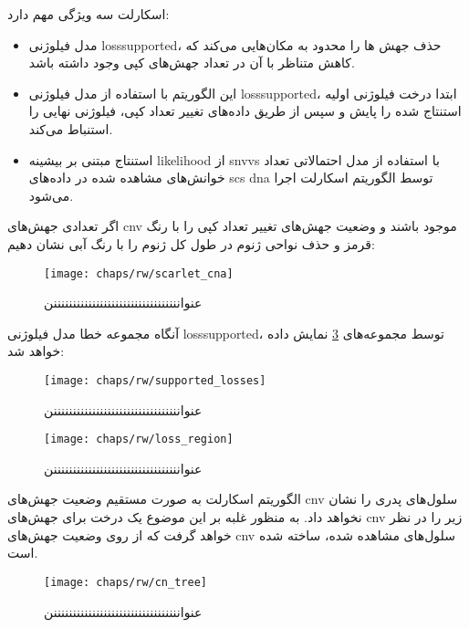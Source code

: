 اسکارلت سه ویژگی مهم دارد: 

\begin{itemize}
	\item     مدل فیلوژنی \gls{losssupported}، حذف جهش ها را محدود به مکان‌هایی می‌کند که کاهش متناظر با آن در تعداد جهش‌های کپی وجود داشته باشد. 
	
	\item 	این الگوریتم با استفاده از مدل فیلوژنی \gls{losssupported}، ابتدا درخت فیلوژنی اولیه استنتاج شده را پایش  و سپس از طریق داده‌های تغییر تعداد کپی، فیلوژنی نهایی را استنباط می‌کند. 
	\item	استنتاج مبتنی بر بیشینه  \gls{likelihood}  از \glspl{snvv} با استفاده از مدل احتمالاتی تعداد خوانش‌های مشاهده شده در داده‌های   \gls{scs} \gls{dna} توسط الگوریتم اسکارلت اجرا می‌شود.  
\end{itemize}




اگر تعدادی جهش‌های \gls{cnv} موجود باشند و  وضعیت جهش‌های تغییر تعداد کپی را با رنگ قرمز و حذف نواحی ژنوم در طول کل ژنوم را با رنگ آبی نشان دهیم:


\begin{figure}[!ht]
	\centerline{\texttt{[image: chaps/rw/scarlet\_cna]}}
	\caption{عنوانننننننننننننننننننننننننننننننننن}
	\label{fig:ch_rw:scarlet_cna}
\end{figure}

آنگاه مجموعه خطا مدل فیلوژنی \gls{losssupported}، توسط مجموعه‌های \ref{fig:ch_rw:loss_region} نمایش داده خواهد شد: 

\begin{figure}[!ht]
	\centerline{\texttt{[image: chaps/rw/supported\_losses]}}
	\caption{عنوانننننننننننننننننننننننننننننننننن}
	\label{fig:ch_rw:supported_losses}
\end{figure}

\begin{figure}[!ht]
	\centerline{\texttt{[image: chaps/rw/loss\_region]}}
	\caption{عنوانننننننننننننننننننننننننننننننننن}
	\label{fig:ch_rw:loss_region}
\end{figure}


الگوریتم اسکارلت به صورت مستقیم وضعیت جهش‌های \gls{cnv} سلول‌های پدری را نشان نخواهد داد. به منظور غلبه بر این موضوع یک درخت برای جهش‌های \gls{cnv} زیر را در نظر خواهد گرفت که از روی وضعیت جهش‌های \gls{cnv} سلو‌‌ل‌های مشاهده شده، ساخته شده است. 


\begin{figure}[!ht]
	\centerline{\texttt{[image: chaps/rw/cn\_tree]}}
	\caption{عنوانننننننننننننننننننننننننننننننننن}
	\label{fig:ch_rw:cn_tree}
\end{figure}


